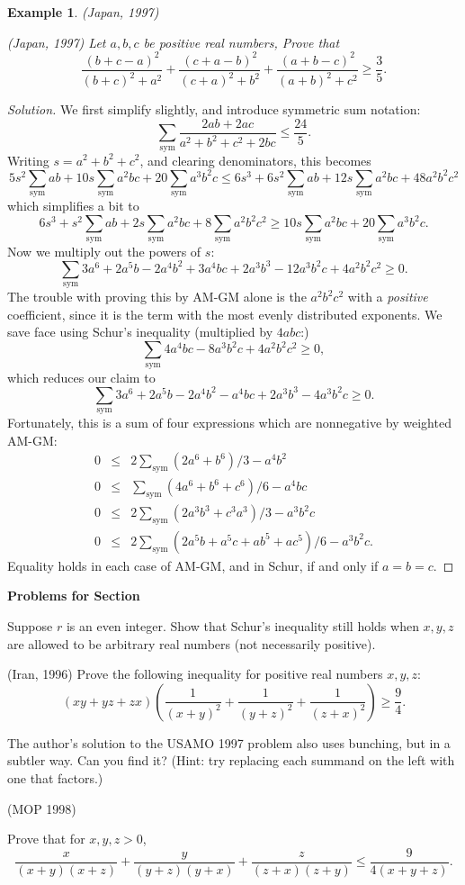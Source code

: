 \documentclass[12pt]{report}
\newtheorem{problem}[theorem]{Example}
\def\ii{\item}
\def\ssym{\sum_{\mathrm{sym}}}
\newcounter{exc}
\numberwithin{exc}{section}
\newenvironment{exer}{\vspace{0.1in}
\noindent \textbf{Problems for Section~\thesection} \vspace{0.1in}
\begin{list}{\arabic{exc}.}{\usecounter{exc}}}{\end{list}}
\begin{document}
\begin{problem}
(Japan, 1997)
\item (Japan, 1997)
Let $a,b,c$ be positive real numbers, Prove that
\[
\frac{(b+c-a)^2}{(b+c)^2+a^2} +
\frac{(c+a-b)^2}{(c+a)^2+b^2} +
\frac{(a+b-c)^2}{(a+b)^2+c^2} \geq \frac 35.
\]
\end{problem}
\begin{proof}[Solution]
We first simplify slightly, and introduce symmetric sum notation:
\[
\ssym \frac{2ab + 2ac}{a^{2}+b^{2}+c^{2}+2bc} \leq \frac{24}{5}.
\]
Writing $s = a^{2}+b^{2}+c^{2}$, and clearing denominators, this 
becomes
\[
5 s^{2} \ssym ab + 10 s \ssym a^{2}bc + 20 \ssym a^{3}b^{2}c
\leq 6 s^{3} + 6 s^{2} \ssym ab + 12 s \ssym a^{2}bc + 48
a^{2}b^{2}c^{2}
\]
which simplifies a bit to
\[
6s^{3} + s^{2} \ssym ab + 2s \ssym a^2bc + 8 \ssym a^{2}b^{2}c^{2}
\geq 10 s \ssym a^{2}bc + 20 \ssym a^{3}b^{2}c.
\]
Now we multiply out the powers of $s$:
\[
\ssym 3a^{6} + 2a^{5}b -2 a^{4}b^{2} + 3a^{4}bc + 2a^{3}b^{3} - 12
a^{3}b^{2}c + 4 a^{2}b^{2}c^{2} \geq 0.
\]
The trouble with proving this by AM-GM alone is the $a^{2}b^{2}c^{2}$ with a
\emph{positive} coefficient, since it is the term with the most evenly 
distributed exponents. We save face using Schur's inequality
(multiplied by $4abc$:)
\[
\ssym 4a^{4}bc - 8a^{3}b^{2}c + 4a^{2}b^{2}c^{2} \geq 0,
\]
which reduces our claim to
\[
\ssym 3a^{6} + 2a^{5}b -2 a^{4}b^{2} - a^{4}bc + 2a^{3}b^{3} - 4
a^{3}b^{2}c \geq 0.
\]
Fortunately, this is a sum of four expressions which are nonnegative 
by weighted AM-GM:
\begin{eqnarray*}
0 &\leq& 2\ssym (2a^6 + b^6)/3 - a^4b^2 \\
0 &\leq& \ssym (4a^6+b^6+c^6)/6 - a^4bc \\
0 &\leq& 2\ssym (2a^3b^3+c^3a^3)/3 - a^3b^2c \\
0 &\leq& 2 \ssym (2a^5b+a^5c+ab^5+ac^5)/6 - a^3b^2c.
\end{eqnarray*}
Equality holds in each case of AM-GM, and in Schur, if and only if $a=b=c$.
\end{proof}

\begin{exer}
\ii
Suppose $r$ is an even integer. Show that Schur's inequality still 
holds when $x,y,z$ are allowed to be arbitrary real numbers (not 
necessarily positive).
\ii
(Iran, 1996) Prove the following inequality for positive real numbers 
$x,y,z$:
\[
(xy + yz + zx) \left( \frac{1}{(x+y)^{2}} + \frac{1}{(y+z)^{2}} + 
\frac{1}{(z+x)^{2}} \right) \geq \frac 94.
\]
\ii
The author's solution to the USAMO 1997 problem also uses bunching, 
but in a subtler way. Can you find it? (Hint: try replacing each 
summand on the left with one that factors.)
\ii (MOP 1998)
\ii
Prove that for $x,y,z > 0$,
\[
\frac{x}{(x+y)(x+z)} + \frac{y}{(y+z)(y+x)} + \frac{z}{(z+x)(z+y)} 
\leq \frac{9}{4(x+y+z)}.
\]
\end{exer}
\end{document}

